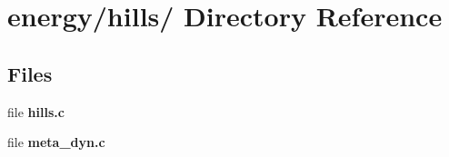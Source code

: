 \section{energy/hills/ Directory Reference}
\label{dir_de610158d8587be3d4329a735b886da5}
\subsection*{Files}
\begin{CompactItemize}
\item 
file {\bf hills.c}
\item 
file {\bf meta\_\-dyn.c}
\end{CompactItemize}
